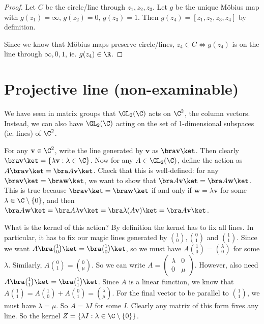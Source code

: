 \documentclass[a4paper]{article}
\begin{document}
\begin{proof}
  Let $C$ be the circle/line through $z_1, z_2, z_3$. Let $g$ be the unique M\"obius map with $g(z_1) = \infty$, $g(z_2) = 0$, $g(z_3) = 1$. Then $g(z_4) = [z_1, z_2, z_3, z_4]$ by definition.

  Since we know that M\"obius maps preserve circle/lines, $z_4\in C \Leftrightarrow g(z_4)$ is on the line through $\infty, 0, 1$, ie. $g(z_4) \in \R$.
\end{proof}

\section{Projective line (non-examinable)}
We have seen in matrix groups that $\GL_2(\C)$ acts on $\C^2$, the column vectors. Instead, we can also have $\GL_2(\C)$ acting on the set of 1-dimensional subspaces (ie. lines) of $\C^2$.

For any $\mathbf{v}\in \C^2$, write the line generated by $\mathbf{v}$ as $\bra \mathbf{v}\ket$. Then clearly $\bra \mathbf{v} \ket = \{\lambda \mathbf{v}: \lambda\in \C\}$. Now for any $A\in \GL_2(\C)$, define the action as $A\bra \mathbf{v}\ket = \bra A\mathbf{v}\ket$. Check that this is well-defined: for any $\bra \mathbf{v} \ket = \bra \mathbf{w}\ket$, we want to show that $\bra A\mathbf{v}\ket = \bra A\mathbf{w}\ket$. This is true because $\bra \mathbf{v} \ket = \bra \mathbf{w}\ket$ if and only if $\mathbf{w} = \lambda \mathbf{v}$ for some $\lambda\in \C\setminus\{0\}$, and then $\bra A\mathbf{w}\ket = \bra A\lambda\mathbf{v}\ket = \bra \lambda (A\mathbf{v})\ket = \bra A\mathbf{v}\ket$.

What is the kernel of this action? By definition the kernel has to fix all lines. In particular, it has to fix our magic lines generated by $\binom{1}{0}, \binom{0}{1}$ and $\binom{1}{1}$. Since we want $A\bra \binom{1}{0}\ket = \bra \binom{1}{0}\ket$, so we must have $A\binom{1}{0} = \binom{\lambda}{0}$ for some $\lambda$. Similarly, $A\binom{0}{1} = \binom{0}{\mu}$. So we can write $A =
\begin{pmatrix}
  \lambda & 0\\
  0 & \mu
\end{pmatrix}$. However, also need $A\bra \binom{1}{1}\ket = \bra\binom{1}{1}\ket$. Since $A$ is a linear function, we know that $A \binom{1}{1} = A \binom{1}{0} + A \binom{0}{1} = \binom{\lambda }{\mu}$. For the final vector to be parallel to $\binom{1}{1}$, we must have $\lambda = \mu$. So $A = \lambda I$ for some $I$. Clearly any matrix of this form fixes any line. So the kernel $Z = \{\lambda I: \lambda\in \C\setminus\{0\}\}$.
\end{document}

